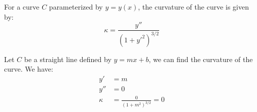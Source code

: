 \documentclass[11pt]{article}
\begin{document}
\begin{theorem}
    For a curve $C$ parameterized by $y = y(x)$, the curvature of the curve is given by:
    \begin{equation}
        \kappa = \frac{y''}{(1 + y'^2)^{3/2}}
    \end{equation}
\end{theorem}
\begin{example}
    Let $C$ be a straight line defined by $y = mx + b$, we can find the curvature of the curve. We have:
    \begin{align*}
        y' &= m \\
        y'' &= 0 \\
        \kappa &= \frac{0}{(1 + m^2)^{3/2}} = 0
    \end{align*}
\end{example}
\end{document}
